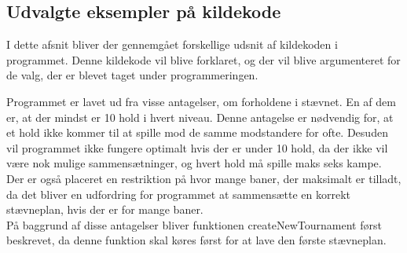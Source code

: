 \subsection*{Udvalgte eksempler på kildekode}
I dette afsnit bliver der gennemgået forskellige udsnit af kildekoden i programmet. Denne kildekode vil blive forklaret, og der vil blive argumenteret for de valg, der er blevet taget under programmeringen.
\par
Programmet er lavet ud fra visse antagelser, om forholdene i stævnet. En af dem er, at der mindst er 10 hold i hvert niveau. Denne antagelse er nødvendig for, at et hold ikke kommer til at spille mod de samme modstandere for ofte. Desuden vil programmet ikke fungere optimalt hvis der er under 10 hold, da der ikke vil være nok mulige sammensætninger, og hvert hold må spille maks seks kampe.
\\
Der er også placeret en restriktion på hvor mange baner, der maksimalt er tilladt, da det bliver en udfordring for programmet at sammensætte en korrekt stævneplan, hvis der er for mange baner.
\\
På baggrund af disse antagelser bliver funktionen createNewTournament først beskrevet, da denne funktion skal køres først for at lave den første stævneplan.

